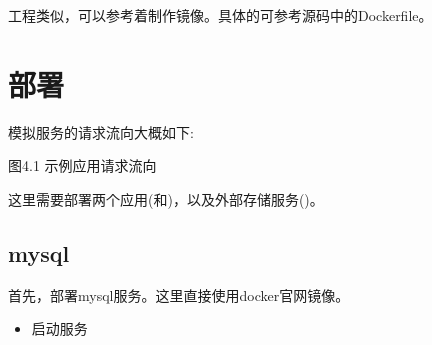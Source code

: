 \documentclass[letterpaper,10pt,english]{sphinxmanual}
\begin{document}
工程类似，可以参考着制作镜像。具体的可参考源码中的Dockerfile。


\section{部署}
\label{\detokenize{docker/practice:id11}}
模拟服务的请求流向大概如下:


图4.1 示例应用请求流向

这里需要部署两个应用(和)，以及外部存储服务()。


\subsection{mysql}
\label{\detokenize{docker/practice:mysql}}
首先，部署mysql服务。这里直接使用docker官网镜像\textendash{}。
\begin{itemize}
\item {} 
启动服务

\end{itemize}
\end{document}
